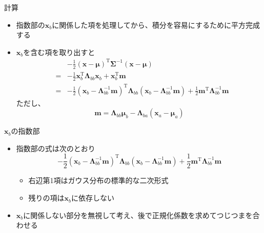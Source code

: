 \begin{frame}{計算}
 \begin{itemize}
  \item 指数部の$\bm{x}_b$に関係した項を処理してから、積分を容易にするために平方完成する
  \item $\bm{x}_b$を含む項を取り出すと
        \begin{eqnarray*}
         && -\frac{1}{2}(\bm{x} - \bm{\mu})^{\mathrm{T}}\bm{\Sigma}^{-1}(\bm{x}-\bm{\mu}) \\
         &=&-\frac{1}{2}\bm{x}^{\mathrm{T}}_b\bm{\Lambda}_{bb}\bm{x}_b+\bm{x}^{\mathrm{T}}_b\bm{m} \\
         &=& -\frac{1}{2}(\bm{x}_b-\bm{\Lambda}_{bb}^{-1}\bm{m})^{\mathrm{T}}\bm{\Lambda}_{bb}(\bm{x}_b-\bm{\Lambda}_{bb}^{-1}\bm{m}) + \frac{1}{2}\bm{m}^{\mathrm{T}}\bm{\Lambda}_{bb}^{-1}\bm{m}
        \end{eqnarray*}
        ただし、
        \begin{equation*}
         \bm{m} =  \bm{\Lambda}_{bb}\bm{\mu}_b - \bm{\Lambda}_{ba}(\bm{x}_a-\bm{\mu}_a)
        \end{equation*}
 \end{itemize}
\end{frame}

\begin{frame}{$\bm{x}_b$の指数部}
 \begin{itemize}
  \item 指数部の式は次のとおり
        \begin{equation}
         -\frac{1}{2}(\bm{x}_b-\bm{\Lambda}_{bb}^{-1}\bm{m})^{\mathrm{T}}\bm{\Lambda}_{bb}(\bm{x}_b-\bm{\Lambda}_{bb}^{-1}\bm{m}) + \frac{1}{2}\bm{m}^{\mathrm{T}}\bm{\Lambda}_{bb}^{-1}\bm{m}
        \end{equation}
        \begin{itemize}
         \item 右辺第1項はガウス分布の標準的な二次形式
         \item 残りの項は$\bm{x}_b$に依存しない
        \end{itemize}
  \item $\bm{x}_b$に関係しない部分を無視して考え、後で正規化係数を求めてつじつまを合わせる
 \end{itemize}
\end{frame}


